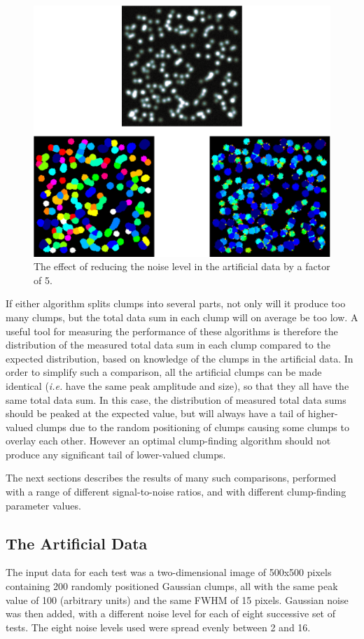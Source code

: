 \documentclass[final,authoryear,5p,times,twocolumn]{elsarticle}
\begin{document}
\begin{figure}
\includegraphics[width=\columnwidth]{comp2}
\caption{The effect of reducing the noise level in the artificial data
by a factor of 5.}
\label{fig:comp2}
\end{figure}

If either algorithm splits clumps into several parts, not only will it
produce too many clumps, but the total data sum in each clump will on
average be too low. A useful tool for measuring the performance of these
algorithms is therefore the distribution of the measured total data sum
in each clump compared to the expected distribution, based on knowledge
of the clumps in the artificial data. In order to simplify such a
comparison, all the artificial clumps can be made identical (\emph{i.e.}
have the same peak amplitude and size), so that they all have the same
total data sum. In this case, the distribution of measured total data
sums should be peaked at the expected value, but will always have a tail
of higher-valued clumps due to the random positioning of clumps causing
some clumps to overlay each other. However an optimal clump-finding
algorithm should not produce any significant tail of lower-valued clumps.

The next sections describes the results of many such comparisons,
performed with a range of different signal-to-noise ratios, and with
different clump-finding parameter values.

\subsection{The Artificial Data}
The input data for each test was a two-dimensional image of 500x500
pixels containing 200 randomly positioned Gaussian clumps, all with the
same peak value of 100 (arbitrary units) and the same FWHM of 15 pixels.
Gaussian noise was then added, with a different noise level for each of
eight successive set of tests. The eight noise levels used were
spread evenly between 2 and 16.
\end{document}
